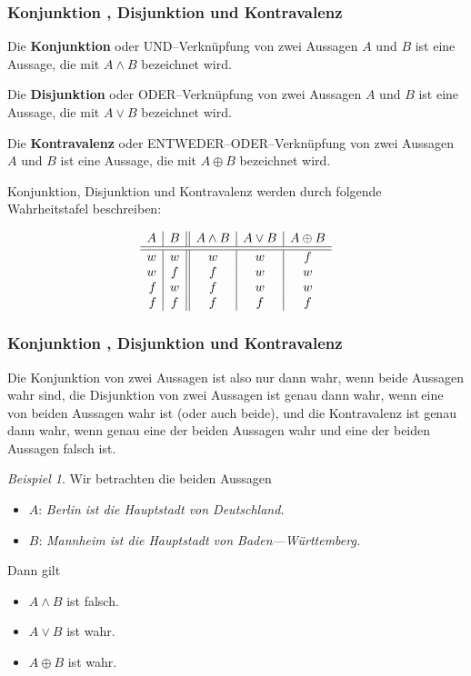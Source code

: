 \documentclass[hyperref={pdfpagelabels=false}]{beamer}
\theoremstyle{plain}%
\theoremstyle{definition}
\theoremstyle{remark}
\newtheorem*{beispiel}{Beispiel}
\begin{document}
\begin{frame}
\frametitle{Konjunktion , Disjunktion und Kontravalenz}

Die \textbf{Konjunktion} oder UND--Verknüpfung von zwei Aussagen $A$ und $B$ ist eine Aussage, die mit 
$A \wedge B$ bezeichnet wird. 

\pause 

Die \textbf{Disjunktion} oder ODER--Verknüpfung von zwei Aussagen $A$ und $B$ ist eine Aussage, die 
mit $A \vee B$ bezeichnet wird. 

\pause

Die \textbf{Kontravalenz} oder ENTWEDER--ODER--Verknüpfung  von zwei Aussagen $A$ und $B$ ist eine Aussage, 
die  mit $A \oplus B$ bezeichnet wird. 

\pause 

Konjunktion, Disjunktion und Kontravalenz werden durch folgende Wahrheitstafel beschreiben:

	$$ \begin{array}{ r | c || c | c | c }
	A & B & A \wedge B & A \vee B & A \oplus B\\
	\hline \hline
	w & w &  w & w & f\\
	w & f &  f & w & w \\
	f & w &  f & w & w \\
	f & f &  f & f & f
	\end{array}$$
\end{frame}

\begin{frame}
\frametitle{Konjunktion , Disjunktion und Kontravalenz}

Die Konjunktion von zwei Aussagen ist also nur dann wahr, wenn beide Aussagen wahr sind, die Disjunktion von 
zwei Aussagen ist genau dann wahr, wenn eine von beiden Aussagen wahr ist (oder auch beide), und die 
Kontravalenz ist genau dann wahr, wenn genau eine der beiden Aussagen wahr und eine der beiden Aussagen falsch ist. 

\pause 

\begin{beispiel}
Wir betrachten die beiden Aussagen 
\begin{itemize}
\item $A$: \textit{Berlin ist die Hauptstadt von Deutschland.} 
\item $B$: \textit{Mannheim 
ist die Hauptstadt von Baden---Württemberg.}
\end{itemize} 
Dann gilt 
\begin{itemize}
\item<3-> $A \wedge B$ ist falsch. 
\item<4-> $A \vee B$ ist wahr. 
\item<5-> $A \oplus B$ ist wahr. 
\end{itemize}
\end{beispiel}

\end{frame}
\end{document}
